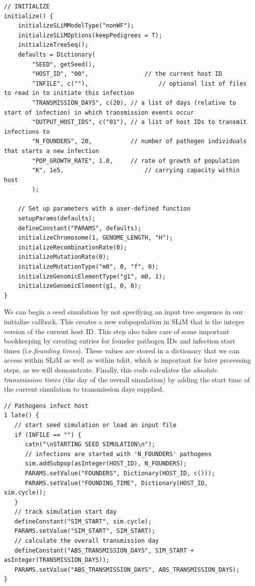 \documentclass[12pt]{article}
\newcommand*{\ie}{i.e.\xcomma}
\begin{document}
\begin{verbatim}
// INITIALIZE
initialize() {
	initializeSLiMModelType("nonWF");
	initializeSLiMOptions(keepPedigrees = T);
	initializeTreeSeq();
	defaults = Dictionary(
		"SEED", getSeed(),
		"HOST_ID", "00", 				// the current host ID
		"INFILE", c(""),					// optional list of files to read in to initiate this infection
		"TRANSMISSION_DAYS", c(20),	// a list of days (relative to start of infection) in which transmission events occur
		"OUTPUT_HOST_IDS", c("01"),	// a list of host IDs to transmit infections to
		"N_FOUNDERS", 20,			// number of pathogen individuals that starts a new infection
		"POP_GROWTH_RATE", 1.0,		// rate of growth of population
		"K", 1e5,						// carrying capacity within host
		);
	
	// Set up parameters with a user-defined function
	setupParams(defaults);
	defineConstant("PARAMS", defaults);
	initializeChromosome(1, GENOME_LENGTH, "H");
	initializeRecombinationRate(0);
	initializeMutationRate(0);
	initializeMutationType("m0", 0, "f", 0);
	initializeGenomicElementType("g1", m0, 1);
	initializeGenomicElement(g1, 0, 0);
}
\end{verbatim}

We can begin a seed simulation by not specifying an input tree sequence in our initialize callback. This creates a new subpopulation in SLiM that is the integer version of the
current host ID. This step also takes care of some important bookkeeping by creating entries for founder pathogen IDs and infection start times (\ie \textit{founding times}). These
values are stored in a dictionary that we can access within SLiM as well as within tskit, which is important for later processing steps, as we will demonstrate. Finally, this code
calculates the \textit{absolute transmission times} (the day of the overall simulation) by adding the start time of the current simulation to transmission days supplied.

\begin{verbatim}
// Pathogens infect host
1 late() {
   // start seed simulation or load an input file
   if (INFILE == "") {
      catn("\nSTARTING SEED SIMULATION\n");
      // infections are started with 'N_FOUNDERS' pathogens
      sim.addSubpop(asInteger(HOST_ID), N_FOUNDERS);
      PARAMS.setValue("FOUNDERS", Dictionary(HOST_ID, c()));
      PARAMS.setValue("FOUNDING_TIME", Dictionary(HOST_ID, sim.cycle));
   }
   // track simulation start day
   defineConstant("SIM_START", sim.cycle);		
   PARAMS.setValue("SIM_START", SIM_START);
   // calculate the overall transmission day
   defineConstant("ABS_TRANSMISSION_DAYS", SIM_START + asInteger(TRANSMISSION_DAYS));
   PARAMS.setValue("ABS_TRANSMISSION_DAYS", ABS_TRANSMISSION_DAYS);
}
\end{verbatim}
\end{document}
